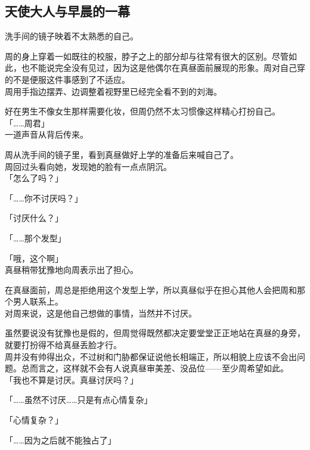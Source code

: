 \subsection{天使大人与早晨的一幕}

洗手间的镜子映着不太熟悉的自己。

周的身上穿着一如既往的校服，脖子之上的部分却与往常有很大的区别。尽管如此，也不能说完全没有见过，因为这是他偶尔在真昼面前展现的形象。周对自己穿的不是便服这件事感到了不适应。\\

周用手指边摆弄、边调整着视野里已经完全看不到的刘海。

好在男生不像女生那样需要化妆，但周仍然不太习惯像这样精心打扮自己。\\

「……周君」\\

一道声音从背后传来。

周从洗手间的镜子里，看到真昼做好上学的准备后来喊自己了。\\

周回过头看向她，发现她的脸有一点点阴沉。\\

「怎么了吗？」

「……你不讨厌吗？」

「讨厌什么？」

「……那个发型」

「哦，这个啊」\\

真昼稍带犹豫地向周表示出了担心。

在真昼面前，周总是拒绝用这个发型上学，所以真昼似乎在担心其他人会把周和那个男人联系上。\\

对周来说，这是他自己想做的事情，当然并不讨厌。

虽然要说没有犹豫也是假的，但周觉得既然都决定要堂堂正正地站在真昼的身旁，就要打扮得不给真昼丢脸才行。\\

周并没有帅得出众，不过树和门胁都保证说他长相端正，所以相貌上应该不会出问题。总而言之，这样就不会有人说真昼审美差、没品位——至少周希望如此。\\

「我也不算是讨厌。真昼讨厌吗？」

「……虽然不讨厌……只是有点心情复杂」

「心情复杂？」

「……因为之后就不能独占了」\\

